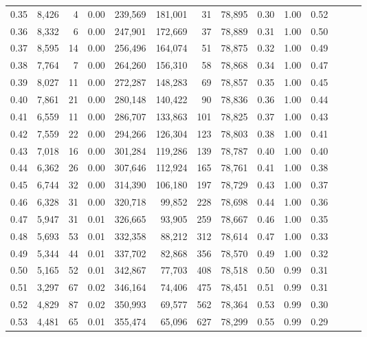 \begin{tabular}{rrrrrrrrrrrrrr}
0.35 &  8,426 &      4 &  0.00 &  239,569 &  181,001 &      31 &  78,895 &  0.30 &  1.00 &      0.52 \\
0.36 &  8,332 &      6 &  0.00 &  247,901 &  172,669 &      37 &  78,889 &  0.31 &  1.00 &      0.50 \\
0.37 &  8,595 &     14 &  0.00 &  256,496 &  164,074 &      51 &  78,875 &  0.32 &  1.00 &      0.49 \\
0.38 &  7,764 &      7 &  0.00 &  264,260 &  156,310 &      58 &  78,868 &  0.34 &  1.00 &      0.47 \\
0.39 &  8,027 &     11 &  0.00 &  272,287 &  148,283 &      69 &  78,857 &  0.35 &  1.00 &      0.45 \\
0.40 &  7,861 &     21 &  0.00 &  280,148 &  140,422 &      90 &  78,836 &  0.36 &  1.00 &      0.44 \\
0.41 &  6,559 &     11 &  0.00 &  286,707 &  133,863 &     101 &  78,825 &  0.37 &  1.00 &      0.43 \\
0.42 &  7,559 &     22 &  0.00 &  294,266 &  126,304 &     123 &  78,803 &  0.38 &  1.00 &      0.41 \\
0.43 &  7,018 &     16 &  0.00 &  301,284 &  119,286 &     139 &  78,787 &  0.40 &  1.00 &      0.40 \\
0.44 &  6,362 &     26 &  0.00 &  307,646 &  112,924 &     165 &  78,761 &  0.41 &  1.00 &      0.38 \\
0.45 &  6,744 &     32 &  0.00 &  314,390 &  106,180 &     197 &  78,729 &  0.43 &  1.00 &      0.37 \\
0.46 &  6,328 &     31 &  0.00 &  320,718 &   99,852 &     228 &  78,698 &  0.44 &  1.00 &      0.36 \\
0.47 &  5,947 &     31 &  0.01 &  326,665 &   93,905 &     259 &  78,667 &  0.46 &  1.00 &      0.35 \\
0.48 &  5,693 &     53 &  0.01 &  332,358 &   88,212 &     312 &  78,614 &  0.47 &  1.00 &      0.33 \\
0.49 &  5,344 &     44 &  0.01 &  337,702 &   82,868 &     356 &  78,570 &  0.49 &  1.00 &      0.32 \\
0.50 &  5,165 &     52 &  0.01 &  342,867 &   77,703 &     408 &  78,518 &  0.50 &  0.99 &      0.31 \\
0.51 &  3,297 &     67 &  0.02 &  346,164 &   74,406 &     475 &  78,451 &  0.51 &  0.99 &      0.31 \\
0.52 &  4,829 &     87 &  0.02 &  350,993 &   69,577 &     562 &  78,364 &  0.53 &  0.99 &      0.30 \\
0.53 &  4,481 &     65 &  0.01 &  355,474 &   65,096 &     627 &  78,299 &  0.55 &  0.99 &      0.29 \\

\end{tabular}
